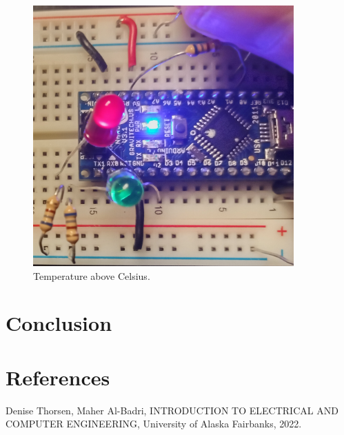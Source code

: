 \documentclass{article}
\begin{document}
\begin{figure}[H]
	\includegraphics[width=10cm]{temp_above}
	\caption{Temperature above Celsius.}
\end{figure}

\newpage
\section{Conclusion}

\newpage
\section{References}
\noindent
[1] Denise Thorsen, Maher Al-Badri, INTRODUCTION TO ELECTRICAL AND COMPUTER ENGINEERING, University of Alaska Fairbanks, 2022.
\newline
\newline
\noindent
\end{document}
